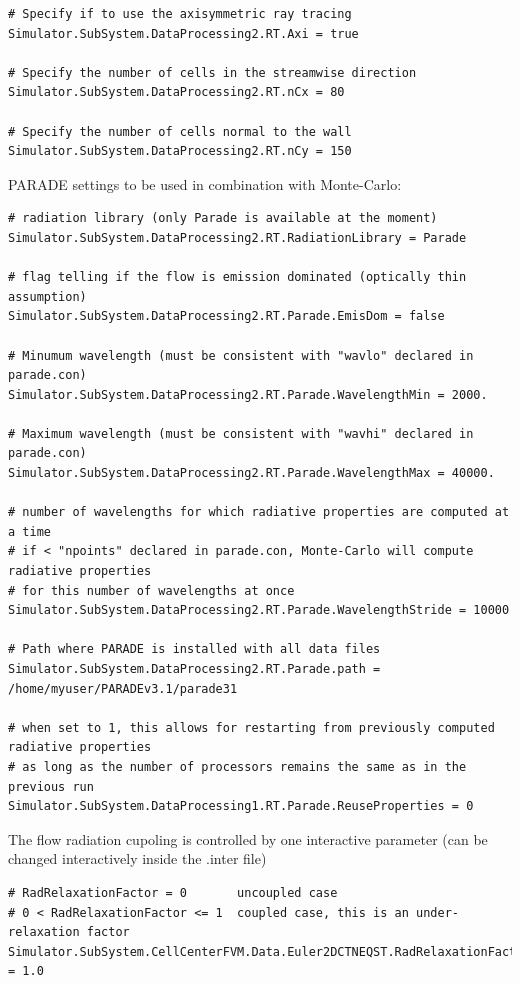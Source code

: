 \documentclass[11pt]{article}
\begin{document}
\begin{lstlisting}[breaklines]
# Specify if to use the axisymmetric ray tracing
Simulator.SubSystem.DataProcessing2.RT.Axi = true

# Specify the number of cells in the streamwise direction
Simulator.SubSystem.DataProcessing2.RT.nCx = 80

# Specify the number of cells normal to the wall
Simulator.SubSystem.DataProcessing2.RT.nCy = 150
\end{lstlisting}

PARADE settings to be used in combination with Monte-Carlo:

\begin{lstlisting}[breaklines]
# radiation library (only Parade is available at the moment)
Simulator.SubSystem.DataProcessing2.RT.RadiationLibrary = Parade

# flag telling if the flow is emission dominated (optically thin assumption) 
Simulator.SubSystem.DataProcessing2.RT.Parade.EmisDom = false

# Minumum wavelength (must be consistent with "wavlo" declared in parade.con) 
Simulator.SubSystem.DataProcessing2.RT.Parade.WavelengthMin = 2000.

# Maximum wavelength (must be consistent with "wavhi" declared in parade.con) 
Simulator.SubSystem.DataProcessing2.RT.Parade.WavelengthMax = 40000.

# number of wavelengths for which radiative properties are computed at a time
# if < "npoints" declared in parade.con, Monte-Carlo will compute radiative properties
# for this number of wavelengths at once 
Simulator.SubSystem.DataProcessing2.RT.Parade.WavelengthStride = 10000

# Path where PARADE is installed with all data files
Simulator.SubSystem.DataProcessing2.RT.Parade.path = /home/myuser/PARADEv3.1/parade31

# when set to 1, this allows for restarting from previously computed radiative properties
# as long as the number of processors remains the same as in the previous run 
Simulator.SubSystem.DataProcessing1.RT.Parade.ReuseProperties = 0
\end{lstlisting}

The flow radiation cupoling is controlled by one interactive parameter (can be changed interactively inside the .inter file)

\begin{lstlisting}[breaklines]
# RadRelaxationFactor = 0       uncoupled case
# 0 < RadRelaxationFactor <= 1  coupled case, this is an under-relaxation factor    
Simulator.SubSystem.CellCenterFVM.Data.Euler2DCTNEQST.RadRelaxationFactor = 1.0
\end{lstlisting}
\end{document}
